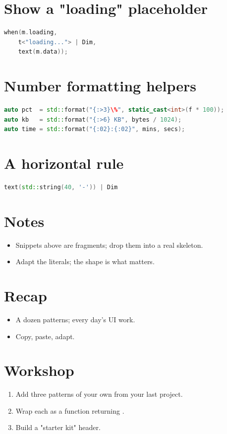 \section{Show a "loading" placeholder}

\begin{lstlisting}[language=C++]
when(m.loading,
    t<"loading..."> | Dim,
    text(m.data));
\end{lstlisting}

\section{Number formatting helpers}

\begin{lstlisting}[language=C++]
auto pct  = std::format("{:>3}\%", static_cast<int>(f * 100));
auto kb   = std::format("{:>6} KB", bytes / 1024);
auto time = std::format("{:02}:{:02}", mins, secs);
\end{lstlisting}

\section{A horizontal rule}

\begin{lstlisting}[language=C++]
text(std::string(40, '-')) | Dim
\end{lstlisting}

\section{Notes}

\begin{itemize}[leftmargin=*]
  \item Snippets above are fragments; drop them into a real
     skeleton.
  \item Adapt the literals; the shape is what matters.
\end{itemize}

\section{Recap}

\begin{recap}
\begin{itemize}[leftmargin=*]
  \item A dozen patterns; every day's UI work.
  \item Copy, paste, adapt.
\end{itemize}
\end{recap}

\section*{Workshop}

\begin{enumerate}[leftmargin=*]
  \item Add three patterns of your own from your last
    project.
  \item Wrap each as a function returning .
  \item Build a "starter kit" header.
\end{enumerate}
